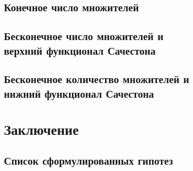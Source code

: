 \documentclass[12pt,a4paper,openbib]{report}
\theoremstyle{definition}
\newcommand\hypotlist{ }
\begin{document}
	

	\section{Конечное число множителей}
	

	\section{Бесконечное число множителей и \\  верхний функционал Сачестона}
	

	\section{Бесконечное количество множителей и \\ нижний функционал Сачестона}
	




\chapter*{Заключение}



\section*{Список сформулированных гипотез}

\renewcommand\label[1]{}
\hypotlist



\makeatletter
{}%
{\toggletrue{bbx:gostbibliography}%
\renewcommand*{\revsdnamepunct}{\addcomma}}{}
\makeatother

\printbibliography{}
\end{document}
